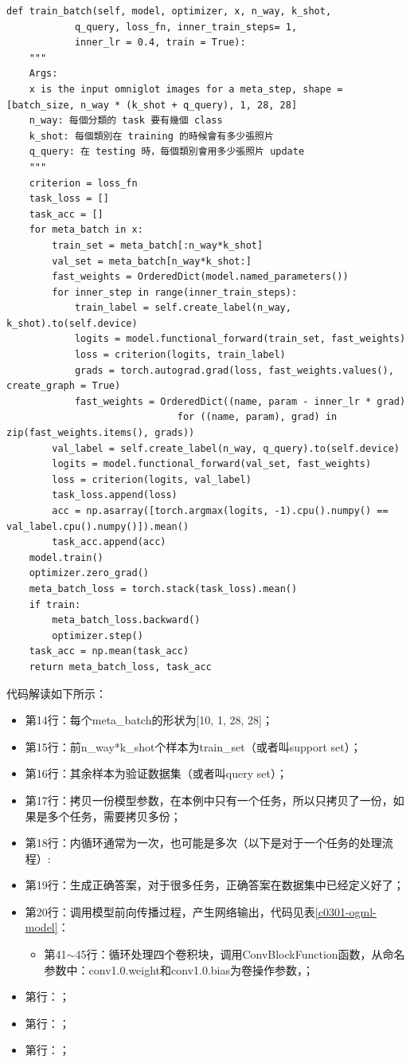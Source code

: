 \begin{lstlisting}
def train_batch(self, model, optimizer, x, n_way, k_shot, 
            q_query, loss_fn, inner_train_steps= 1, 
            inner_lr = 0.4, train = True):
    """
    Args:
    x is the input omniglot images for a meta_step, shape = [batch_size, n_way * (k_shot + q_query), 1, 28, 28]
    n_way: 每個分類的 task 要有幾個 class
    k_shot: 每個類別在 training 的時候會有多少張照片
    q_query: 在 testing 時，每個類別會用多少張照片 update
    """
    criterion = loss_fn
    task_loss = []
    task_acc = []
    for meta_batch in x:
        train_set = meta_batch[:n_way*k_shot]
        val_set = meta_batch[n_way*k_shot:]
        fast_weights = OrderedDict(model.named_parameters())
        for inner_step in range(inner_train_steps):
            train_label = self.create_label(n_way, k_shot).to(self.device)
            logits = model.functional_forward(train_set, fast_weights)
            loss = criterion(logits, train_label)
            grads = torch.autograd.grad(loss, fast_weights.values(), create_graph = True)
            fast_weights = OrderedDict((name, param - inner_lr * grad)
                              for ((name, param), grad) in zip(fast_weights.items(), grads))
        val_label = self.create_label(n_way, q_query).to(self.device)
        logits = model.functional_forward(val_set, fast_weights)
        loss = criterion(logits, val_label)
        task_loss.append(loss)
        acc = np.asarray([torch.argmax(logits, -1).cpu().numpy() == val_label.cpu().numpy()]).mean()
        task_acc.append(acc)
    model.train()
    optimizer.zero_grad()
    meta_batch_loss = torch.stack(task_loss).mean()
    if train:
        meta_batch_loss.backward()
        optimizer.step()
    task_acc = np.mean(task_acc)
    return meta_batch_loss, task_acc
\end{lstlisting}
代码解读如下所示：
\begin{itemize}
\item 第14行：每个meta\_batch的形状为[10, 1, 28, 28]；
\item 第15行：前n\_way*k\_shot个样本为train\_set（或者叫support set）；
\item 第16行：其余样本为验证数据集（或者叫query set）；
\item 第17行：拷贝一份模型参数，在本例中只有一个任务，所以只拷贝了一份，如果是多个任务，需要拷贝多份；
\item 第18行：内循环通常为一次，也可能是多次（以下是对于一个任务的处理流程）:
\item 第19行：生成正确答案，对于很多任务，正确答案在数据集中已经定义好了；
\item 第20行：调用模型前向传播过程，产生网络输出，代码见表\ref{c0301-ogml-model}：
	\begin{itemize}
	\item 第41$\sim$45行：循环处理四个卷积块，调用ConvBlockFunction函数，从命名参数中：conv1.0.weight和conv1.0.bias为卷操作参数，；
	\end{itemize}
\item 第行：；
\item 第行：；
\item 第行：；
\end{itemize}
